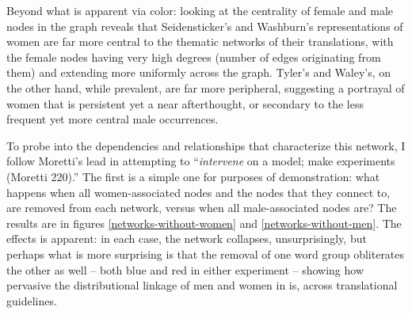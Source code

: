 \documentclass[12pt]{article}
\begin{document}
\begin{flushleft}
\begin{spacing}{2.0}
Beyond what is apparent via color: looking at the centrality of female and male nodes in the graph reveals that Seidensticker's and Washburn's representations of women are far more central to the thematic networks of their translations, with the female nodes having very high degrees (number of edges originating from them) and extending more uniformly across the graph. Tyler's and Waley's, on the other hand, while prevalent, are far more peripheral, suggesting a portrayal of women that is persistent yet a near afterthought, or secondary to the less frequent yet more central male occurrences. 

To probe into the dependencies and relationships that characterize this network, I follow Moretti's lead in attempting to ``\textit{intervene} on a model; make experiments (Moretti 220).'' The first is a simple one for purposes of demonstration: what happens when all women-associated nodes and the nodes that they connect to, are removed from each network, versus when all male-associated nodes are? The results are in figures \ref{networks-without-women} and \ref{networks-without-men}. The effects is apparent: in each case, the network collapses, unsurprisingly, but perhaps what is more surprising is that the removal of one word group obliterates the other as well -- both blue and red in either experiment -- showing how pervasive the distributional linkage of men and women in  is, across translational guidelines. 


\end{spacing}
\end{flushleft}
\end{document}
